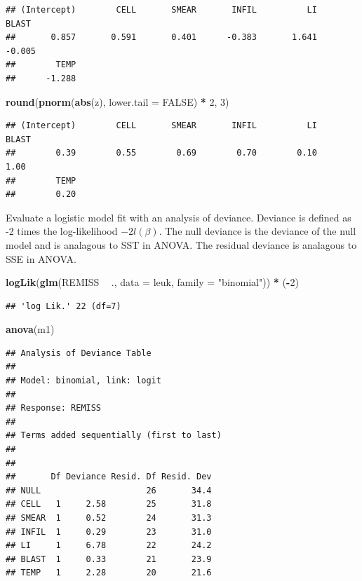 \documentclass[
]{book}
\newenvironment{Shaded}{\begin{snugshade}}{\end{snugshade}}
\newcommand{\DataTypeTok}[1]{\textcolor[rgb]{0.13,0.29,0.53}{#1}}
\newcommand{\DecValTok}[1]{\textcolor[rgb]{0.00,0.00,0.81}{#1}}
\newcommand{\KeywordTok}[1]{\textcolor[rgb]{0.13,0.29,0.53}{\textbf{#1}}}
\newcommand{\NormalTok}[1]{#1}
\newcommand{\OperatorTok}[1]{\textcolor[rgb]{0.81,0.36,0.00}{\textbf{#1}}}
\newcommand{\OtherTok}[1]{\textcolor[rgb]{0.56,0.35,0.01}{#1}}
\newcommand{\StringTok}[1]{\textcolor[rgb]{0.31,0.60,0.02}{#1}}
\begin{document}
\begin{verbatim}
## (Intercept)        CELL       SMEAR       INFIL          LI       BLAST 
##       0.857       0.591       0.401      -0.383       1.641      -0.005 
##        TEMP 
##      -1.288
\end{verbatim}

\begin{Shaded}
\begin{Highlighting}[]
\KeywordTok{round}\NormalTok{(}\KeywordTok{pnorm}\NormalTok{(}\KeywordTok{abs}\NormalTok{(z), }\DataTypeTok{lower.tail =} \OtherTok{FALSE}\NormalTok{) }\OperatorTok{*}\StringTok{ }\DecValTok{2}\NormalTok{, }\DecValTok{3}\NormalTok{)}
\end{Highlighting}
\end{Shaded}

\begin{verbatim}
## (Intercept)        CELL       SMEAR       INFIL          LI       BLAST 
##        0.39        0.55        0.69        0.70        0.10        1.00 
##        TEMP 
##        0.20
\end{verbatim}

Evaluate a logistic model fit with an analysis of deviance. Deviance is defined as -2 times the log-likelihood \(-2l(\beta)\). The null deviance is the deviance of the null model and is analagous to SST in ANOVA. The residual deviance is analagous to SSE in ANOVA.

\begin{Shaded}
\begin{Highlighting}[]
\KeywordTok{logLik}\NormalTok{(}\KeywordTok{glm}\NormalTok{(REMISS }\OperatorTok{~}\StringTok{ }\NormalTok{., }\DataTypeTok{data =}\NormalTok{ leuk, }\DataTypeTok{family =} \StringTok{"binomial"}\NormalTok{)) }\OperatorTok{*}\StringTok{ }\NormalTok{(}\OperatorTok{-}\DecValTok{2}\NormalTok{)}
\end{Highlighting}
\end{Shaded}

\begin{verbatim}
## 'log Lik.' 22 (df=7)
\end{verbatim}

\begin{Shaded}
\begin{Highlighting}[]
\KeywordTok{anova}\NormalTok{(m1)}
\end{Highlighting}
\end{Shaded}

\begin{verbatim}
## Analysis of Deviance Table
## 
## Model: binomial, link: logit
## 
## Response: REMISS
## 
## Terms added sequentially (first to last)
## 
## 
##       Df Deviance Resid. Df Resid. Dev
## NULL                     26       34.4
## CELL   1     2.58        25       31.8
## SMEAR  1     0.52        24       31.3
## INFIL  1     0.29        23       31.0
## LI     1     6.78        22       24.2
## BLAST  1     0.33        21       23.9
## TEMP   1     2.28        20       21.6
\end{verbatim}
\end{document}

